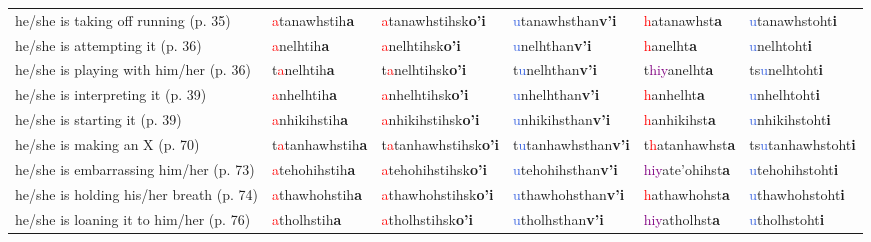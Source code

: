 \documentclass[oneside,openany]{book}%
\begin{document}
\begin{tabularx}{\textwidth}{>{\hsize=1.5\hsize\RaggedRight}X >{\hsize=0.9\hsize}X >{\hsize=0.9\hsize}X >{\hsize=0.9\hsize}X >{\hsize=0.9\hsize}X >{\hsize=0.9\hsize}X}
he/she is taking off running (p. 35)&\textcolor{Red}{a}tanawhstih\textbf{a}&\textcolor{Red}{a}tanawhstihsk\textbf{o'i}&\textcolor{RoyalBlue}{u}tanawhsthan\textbf{v'i}&\textcolor{Red}{h}atanawhst\textbf{a}&\textcolor{RoyalBlue}{u}tanawhstoht\textbf{i}\\%
he/she is attempting it (p. 36)&\textcolor{Red}{a}nelhtih\textbf{a}&\textcolor{Red}{a}nelhtihsk\textbf{o'i}&\textcolor{RoyalBlue}{u}nelhthan\textbf{v'i}&\textcolor{Red}{h}anelht\textbf{a}&\textcolor{RoyalBlue}{u}nelhtoht\textbf{i}\\%
he/she is playing with him/her (p. 36)&t\textcolor{Red}{a}nelhtih\textbf{a}&t\textcolor{Red}{a}nelhtihsk\textbf{o'i}&t\textcolor{RoyalBlue}{u}nelhthan\textbf{v'i}&t\textcolor{Purple}{hiy}anelht\textbf{a}&ts\textcolor{RoyalBlue}{u}nelhtoht\textbf{i}\\%
he/she is interpreting it (p. 39)&\textcolor{Red}{a}nhelhtih\textbf{a}&\textcolor{Red}{a}nhelhtihsk\textbf{o'i}&\textcolor{RoyalBlue}{u}nhelhthan\textbf{v'i}&\textcolor{Red}{h}anhelht\textbf{a}&\textcolor{RoyalBlue}{u}nhelhtoht\textbf{i}\\%
he/she is starting it (p. 39)&\textcolor{Red}{a}nhikihstih\textbf{a}&\textcolor{Red}{a}nhikihstihsk\textbf{o'i}&\textcolor{RoyalBlue}{u}nhikihsthan\textbf{v'i}&\textcolor{Red}{h}anhikihst\textbf{a}&\textcolor{RoyalBlue}{u}nhikihstoht\textbf{i}\\%
he/she is making an X (p. 70)&t\textcolor{Red}{a}tanhawhstih\textbf{a}&t\textcolor{Red}{a}tanhawhstihsk\textbf{o'i}&t\textcolor{RoyalBlue}{u}tanhawhsthan\textbf{v'i}&t\textcolor{Red}{h}atanhawhst\textbf{a}&ts\textcolor{RoyalBlue}{u}tanhawhstoht\textbf{i}\\%
he/she is embarrassing him/her (p. 73)&\textcolor{Red}{a}tehohihstih\textbf{a}&\textcolor{Red}{a}tehohihstihsk\textbf{o'i}&\textcolor{RoyalBlue}{u}tehohihsthan\textbf{v'i}&\textcolor{Purple}{hiy}ate'ohihst\textbf{a}&\textcolor{RoyalBlue}{u}tehohihstoht\textbf{i}\\%
he/she is holding his/her breath (p. 74)&\textcolor{Red}{a}thawhohstih\textbf{a}&\textcolor{Red}{a}thawhohstihsk\textbf{o'i}&\textcolor{RoyalBlue}{u}thawhohsthan\textbf{v'i}&\textcolor{Red}{h}athawhohst\textbf{a}&\textcolor{RoyalBlue}{u}thawhohstoht\textbf{i}\\%
he/she is loaning it to him/her (p. 76)&\textcolor{Red}{a}tholhstih\textbf{a}&\textcolor{Red}{a}tholhstihsk\textbf{o'i}&\textcolor{RoyalBlue}{u}tholhsthan\textbf{v'i}&\textcolor{Purple}{hiy}atholhst\textbf{a}&\textcolor{RoyalBlue}{u}tholhstoht\textbf{i}\\%

\end{tabularx}
\end{document}
